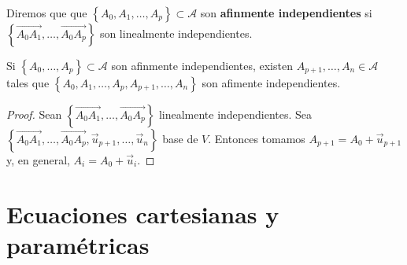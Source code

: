 \begin{fdefinition}[]
	\normalfont Diremos que que $\displaystyle \left\{ A_{0}, A_{1}, \ldots, A_{p}\right\} \subset \mathcal{A} $ son \textbf{afinmente independientes} si $\displaystyle \left\{ \overrightarrow{A_{0}A_{1}}, \ldots, \overrightarrow{A_{0}A_{p}}\right\}  $ son linealmente independientes.
\end{fdefinition}
\begin{fprop}[]
\normalfont Si $\displaystyle \left\{ A_{0}, \ldots, A_{p}\right\} \subset \mathcal{A} $ son afinmente independientes, existen $\displaystyle A_{p + 1}, \ldots, A_{n} \in\mathcal{A} $ tales que $\displaystyle \left\{ A_{0}, A_{1}, \ldots, A_{p}, A_{p + 1}, \ldots, A_{n}\right\}  $ son afimente independientes.
\end{fprop}
\begin{proof}
	Sean $\displaystyle \left\{ \overrightarrow{A_{0}A_{1}}, \ldots, \overrightarrow{A_{0}A_{p}}\right\}  $ linealmente independientes. Sea $\displaystyle \left\{ \overrightarrow{A_{0}A_{1}}, \ldots, \overrightarrow{A_{0}A_{p}}, \vec{u}_{p + 1}, \ldots, \vec{u}_{n}\right\} $ base de $\displaystyle V $. Entonces tomamos $\displaystyle A_{p + 1}= A_{0} + \vec{u}_{p +1} $  y, en general, $\displaystyle A_{i} = A_{0} + \vec{u}_{i} $.
\end{proof}
\section{Ecuaciones cartesianas y paramétricas}

